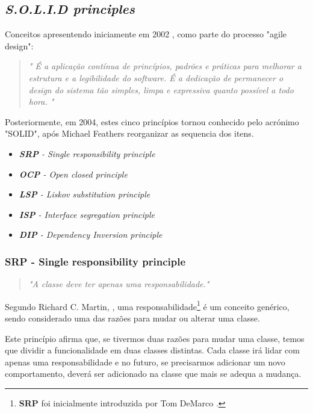 \documentclass[12pt]{article}
\begin{document}
\subsection{\textit{S.O.L.I.D principles}} \label{sec:solid}

 Conceitos apresentendo iniciamente em 2002 \cite{ROBERT_MARTIN_AGILE_SW_DEV_PPP}, como parte do processo "agile design":
 
 \begin{quote}
\textit{" É a aplicação contínua de princípios, padrões e práticas para melhorar a estrutura e a legibilidade do software. É a dedicação de permanecer o design do sistema tão simples, limpa e expressiva quanto possível a todo hora. "}
 \end{quote}

 Posteriormente, em 2004, estes cinco princípios tornou conhecido pelo acrónimo "SOLID", após Michael Feathers reorganizar as sequencia dos itens. 

\begin{itemize}
	\item \textit{\textbf{SRP} - Single responsibility principle}
	\item \textit{\textbf{OCP} - Open closed principle}
	\item \textit{\textbf{LSP} - Liskov substitution principle}
	\item \textit{\textbf{ISP} - Interface segregation principle}
	\item \textit{\textbf{DIP} - Dependency Inversion principle}
\end{itemize}

\subsubsection{SRP - Single responsibility principle}

\begin{quote}
	\textit{"A classe deve ter apenas uma responsabilidade."}
\end{quote}

Segundo Richard C. Martin, \cite{ROBERT_MARTIN_THE_CLEAN_ARCHITECTURE}, uma responsabilidade\footnote{\textbf{SRP} foi inicialmente introduzida por Tom DeMarco \cite{SASS_SRP}.} é um conceito genérico, sendo considerado uma das razões para mudar ou alterar uma classe. 

Este princípio afirma que, se tivermos duas razões para mudar uma classe, temos que dividir a funcionalidade em duas classes distintas. Cada classe irá lidar com apenas uma responsabilidade e no futuro, se precisarmos adicionar um novo comportamento, deverá ser adicionado na classe que mais se adequa a mudança.
\end{document}
